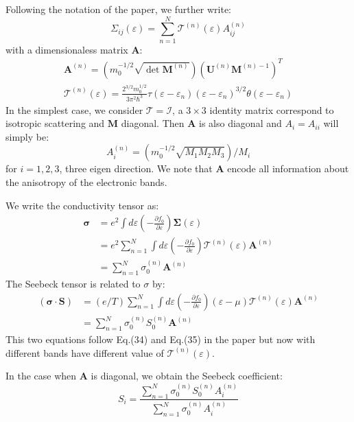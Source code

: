 \documentclass{article}
\newcommand{\pfrac}[2]{\frac{\partial #1}{\partial #2}}
\begin{document}
Following the notation of the paper, we further write:
\begin{equation}
    \Sigma_{ij} (\varepsilon) = \sum_{n=1}^N \mathcal{T}^{(n)}(\varepsilon) A_{ij}^{(n)}
\end{equation}
with a dimensionaless matrix $\mathbf{A}$:
\begin{gather}
    \mathbf{A}^{(n)} = \left( m_0^{-1/2} \sqrt{\det \mathbf{M}^{(n)}} \right) 
        \left( \mathbf{U}^{(n)} \mathbf{M}^{(n)-1} \right)^T \\
    \mathcal{T}^{(n)}(\varepsilon) = \frac{2^{3/2} m_0^{1/2}}{3\pi^2\hbar^3}
    \tau(\varepsilon - \varepsilon_n) (\varepsilon - \varepsilon_n)^{3/2} \theta(\varepsilon - \varepsilon_n)
\end{gather}
In the simplest case, we consider $\mathcal{T} = \mathcal{I}$, a $3\times 3$ identity matrix
correspond to isotropic scattering
and $\mathbf{M}$ diagonal. Then $\mathbf{A}$ is also diagonal and
 $A_{i} = A_{ii}$ will simply be:
\begin{equation}
    A^{(n)}_{i} = \left( m_0^{-1/2} \sqrt{M_1 M_2 M_3} \right) / M_i
\end{equation}
for $i = 1,2,3$, three eigen direction. We note that $\mathbf{A}$ encode all information 
about the anisotropy of the electronic bands.

We write the conductivity tensor as:
\begin{align}
    \mathbf{\sigma} &= e^2\int d\varepsilon \left( -\pfrac{f_0}{\varepsilon} \right) \mathbf{\Sigma}(\varepsilon) \\
            &= e^2 \sum_{n=1}^N \int d\varepsilon \left( -\pfrac{f_0}{\varepsilon} \right) \mathcal{T}^{(n)}(\varepsilon) \mathbf{A}^{(n)} \\
            &= \sum_{n=1}^N \sigma_0^{(n)} \mathbf{A}^{(n)}
\end{align}
The Seebeck tensor is related to $\sigma$ by:
\begin{align}
    \mathbf{(\sigma \cdot S)} &= (e/T) \sum_{n=1}^N \int d\varepsilon 
            \left(-\pfrac{f_0}{\varepsilon}\right)(\varepsilon - \mu) \mathcal{T}^{(n)}(\varepsilon) \mathbf{A}^{(n)} \\
        &= \sum_{n=1}^N \sigma_0^{(n)} S_0^{(n)} \mathbf{A}^{(n)}
\end{align}
This two equations follow Eq.(34) and Eq.(35) in the paper but now with different 
bands have different value of $\mathcal{T}^{(n)}(\varepsilon)$. 

In the case when $\mathbf{A}$ is diagonal, we obtain the Seebeck coefficient:
\begin{equation}
    S_i = \frac{\sum_{n=1}^N \sigma_0^{(n)} S_0^{(n)} A_i^{(n)}}{\sum_{n=1}^N \sigma_0^{(n)} A_i^{(n)}}
\end{equation}
\end{document}
